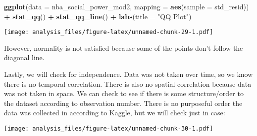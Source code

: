 \documentclass[]{article}
\newenvironment{Shaded}{\begin{snugshade}}{\end{snugshade}}
\newcommand{\DataTypeTok}[1]{\textcolor[rgb]{0.13,0.29,0.53}{#1}}
\newcommand{\DecValTok}[1]{\textcolor[rgb]{0.00,0.00,0.81}{#1}}
\newcommand{\FloatTok}[1]{\textcolor[rgb]{0.00,0.00,0.81}{#1}}
\newcommand{\KeywordTok}[1]{\textcolor[rgb]{0.13,0.29,0.53}{\textbf{#1}}}
\newcommand{\NormalTok}[1]{#1}
\newcommand{\OperatorTok}[1]{\textcolor[rgb]{0.81,0.36,0.00}{\textbf{#1}}}
\newcommand{\StringTok}[1]{\textcolor[rgb]{0.31,0.60,0.02}{#1}}
\begin{document}
\begin{Shaded}
\begin{Highlighting}[]
\KeywordTok{ggplot}\NormalTok{(}\DataTypeTok{data =}\NormalTok{ nba_social_power_mod2, }\DataTypeTok{mapping =} \KeywordTok{aes}\NormalTok{(}\DataTypeTok{sample =}\NormalTok{ std_resid)) }\OperatorTok{+}\StringTok{ }\KeywordTok{stat_qq}\NormalTok{() }\OperatorTok{+}\StringTok{ }\KeywordTok{stat_qq_line}\NormalTok{() }\OperatorTok{+}\StringTok{ }\KeywordTok{labs}\NormalTok{(}\DataTypeTok{title =} \StringTok{"QQ Plot"}\NormalTok{)}
\end{Highlighting}
\end{Shaded}

\texttt{[image: analysis\_files/figure-latex/unnamed-chunk-29-1.pdf]}

However, normality is not satisfied because some of the points don't
follow the diagonal line.

Lastly, we will check for independence. Data was not taken over time, so
we know there is no temporal correlation. There is also no spatial
correlation because data was not taken in space. We can check to see if
there is some structure/order to the dataset according to observation
number. There is no purposeful order the data was collected in according
to Kaggle, but we will check just in case:

\begin{Shaded}
\end{Shaded}

\texttt{[image: analysis\_files/figure-latex/unnamed-chunk-30-1.pdf]}
\end{document}
